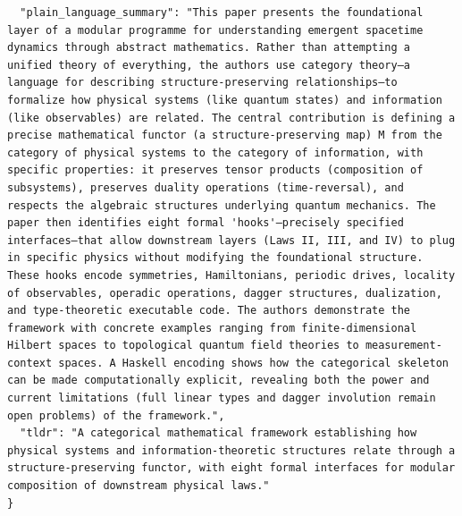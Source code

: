 \documentclass[11pt]{article}
\begin{document}
\begin{verbatim}
  "plain_language_summary": "This paper presents the foundational layer of a modular programme for understanding emergent spacetime dynamics through abstract mathematics. Rather than attempting a unified theory of everything, the authors use category theory—a language for describing structure-preserving relationships—to formalize how physical systems (like quantum states) and information (like observables) are related. The central contribution is defining a precise mathematical functor (a structure-preserving map) M from the category of physical systems to the category of information, with specific properties: it preserves tensor products (composition of subsystems), preserves duality operations (time-reversal), and respects the algebraic structures underlying quantum mechanics. The paper then identifies eight formal 'hooks'—precisely specified interfaces—that allow downstream layers (Laws II, III, and IV) to plug in specific physics without modifying the foundational structure. These hooks encode symmetries, Hamiltonians, periodic drives, locality of observables, operadic operations, dagger structures, dualization, and type-theoretic executable code. The authors demonstrate the framework with concrete examples ranging from finite-dimensional Hilbert spaces to topological quantum field theories to measurement-context spaces. A Haskell encoding shows how the categorical skeleton can be made computationally explicit, revealing both the power and current limitations (full linear types and dagger involution remain open problems) of the framework.",
  "tldr": "A categorical mathematical framework establishing how physical systems and information-theoretic structures relate through a structure-preserving functor, with eight formal interfaces for modular composition of downstream physical laws."
}
\end{verbatim}
\end{document}
